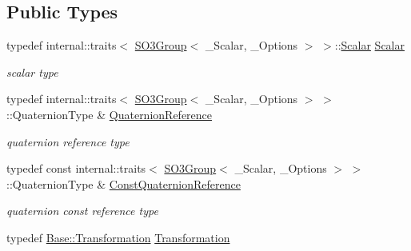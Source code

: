 \subsection*{Public Types}
\begin{DoxyCompactItemize}
\item 
typedef internal\+::traits$<$ \hyperlink{class_sophus_1_1_s_o3_group}{S\+O3\+Group}$<$ \+\_\+\+Scalar, \+\_\+\+Options $>$ $>$\+::\hyperlink{class_sophus_1_1_rx_s_o3_group_a0c1248ba4deaab0ef231b74c60f77f87}{Scalar} \hyperlink{class_sophus_1_1_rx_s_o3_group_a0c1248ba4deaab0ef231b74c60f77f87}{Scalar}\hypertarget{class_sophus_1_1_rx_s_o3_group_a0c1248ba4deaab0ef231b74c60f77f87}{}\label{class_sophus_1_1_rx_s_o3_group_a0c1248ba4deaab0ef231b74c60f77f87}

\begin{DoxyCompactList}\small\item\em scalar type \end{DoxyCompactList}\item 
typedef internal\+::traits$<$ \hyperlink{class_sophus_1_1_s_o3_group}{S\+O3\+Group}$<$ \+\_\+\+Scalar, \+\_\+\+Options $>$ $>$\+::Quaternion\+Type \& \hyperlink{class_sophus_1_1_rx_s_o3_group_a01e579c31ebe7063ef5b737f53cd99cb}{Quaternion\+Reference}\hypertarget{class_sophus_1_1_rx_s_o3_group_a01e579c31ebe7063ef5b737f53cd99cb}{}\label{class_sophus_1_1_rx_s_o3_group_a01e579c31ebe7063ef5b737f53cd99cb}

\begin{DoxyCompactList}\small\item\em quaternion reference type \end{DoxyCompactList}\item 
typedef const internal\+::traits$<$ \hyperlink{class_sophus_1_1_s_o3_group}{S\+O3\+Group}$<$ \+\_\+\+Scalar, \+\_\+\+Options $>$ $>$\+::Quaternion\+Type \& \hyperlink{class_sophus_1_1_rx_s_o3_group_a03c34f6992514111a4fb03a1edce083f}{Const\+Quaternion\+Reference}\hypertarget{class_sophus_1_1_rx_s_o3_group_a03c34f6992514111a4fb03a1edce083f}{}\label{class_sophus_1_1_rx_s_o3_group_a03c34f6992514111a4fb03a1edce083f}

\begin{DoxyCompactList}\small\item\em quaternion const reference type \end{DoxyCompactList}\item 
typedef \hyperlink{class_sophus_1_1_rx_s_o3_group_base_a60b2d8cd20692d3d39e5e7c729d95145}{Base\+::\+Transformation} \hyperlink{class_sophus_1_1_rx_s_o3_group_ac8c43cedd9690622ff696fd1473fdfce}{Transformation}\hypertarget{class_sophus_1_1_rx_s_o3_group_ac8c43cedd9690622ff696fd1473fdfce}{}\label{class_sophus_1_1_rx_s_o3_group_ac8c43cedd9690622ff696fd1473fdfce}


\end{DoxyCompactItemize}
